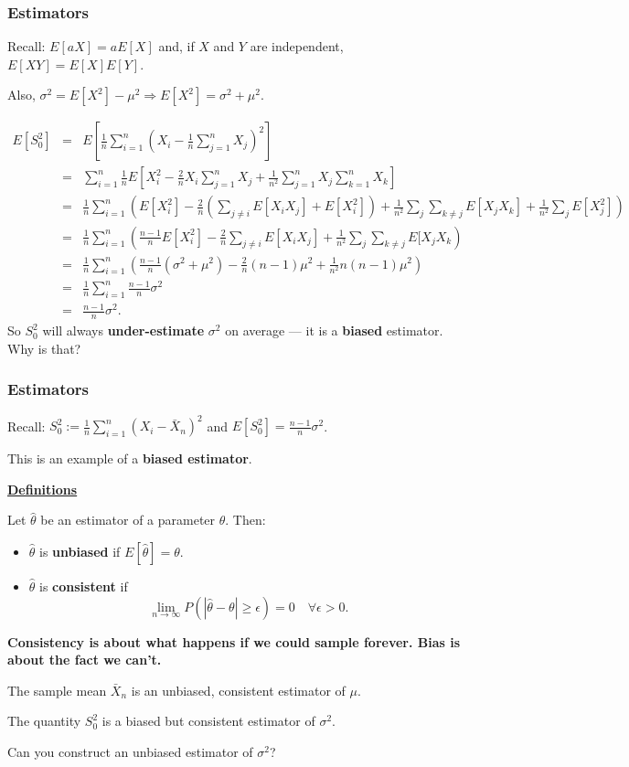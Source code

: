 \documentclass[t,8pt]{beamer}
\begin{document}
\begin{frame}
	\frametitle{Estimators}
	Recall: $E[aX]=aE[X]$ and, if $X$ and $Y$ are independent, $E[XY]=E[X]E[Y]$. \par
	Also, $\sigma^2=E[X^2]-\mu^2\Rightarrow E[X^2]=\sigma^2+\mu^2$. \par
	{\tiny
		\begin{eqnarray*}
			E[S_0^2]
			&=&E\left[\frac{1}{n}\sum_{i=1}^n\left(X_i-\frac{1}{n}\sum_{j=1}^nX_j\right)^2\right] \\
			&=&\sum_{i=1}^n\frac{1}{n}E\left[X_i^2-\frac{2}{n}X_i\sum_{j=1}^nX_j+\frac{1}{n^2}\sum_{j=1}^nX_j\sum_{k=1}^nX_k\right] \\
			&=&\frac{1}{n}\sum_{i=1}^n\left(E[X_i^2]-\frac{2}{n}\left(\sum_{j\neq i}E[X_iX_j]+E[X_i^2]\right)+\frac{1}{n^2}\sum_j\sum_{k\neq j}E[X_jX_k]+\frac{1}{n^2}\sum_jE[X_j^2]\right) \\
			&=&\frac{1}{n}\sum_{i=1}^n\left(\frac{n-1}{n}E[X_i^2]-\frac{2}{n}\sum_{j\neq i}E[X_iX_j]+\frac{1}{n^2}\sum_j\sum_{k\neq j}E[X_jX_k\right) \\
			&=&\frac{1}{n}\sum_{i=1}^n\left(\frac{n-1}{n}(\sigma^2+\mu^2)-\frac{2}{n}(n-1)\mu^2+\frac{1}{n^2}n(n-1)\mu^2\right) \\
			&=&\frac{1}{n}\sum_{i=1}^n\frac{n-1}{n}\sigma^2 \\
			&=&\frac{n-1}{n}\sigma^2.
		\end{eqnarray*}
	}
	So $S_0^2$ will always {\bf under-estimate} $\sigma^2$ on average — it is a {\bf biased} estimator. Why is that?
\end{frame}

\begin{frame}
	\frametitle{Estimators}
	Recall: $S_0^2:=\frac{1}{n}\sum_{i=1}^n(X_i-\bar X_n)^2$ and $E[S_0^2]=\frac{n-1}{n}\sigma^2$. \par
	This is an example of a {\bf biased estimator}. \par
	{\bf\underline{Definitions}} \par
	Let $\hat\theta$ be an estimator of a parameter $\theta$. Then:
	\begin{itemize}
		\item $\hat\theta$ is {\bf unbiased} if $E[\hat\theta]=\theta$.
		\item $\hat\theta$ is {\bf consistent} if
		\[
		\lim_{n\rightarrow\infty}P(|\hat\theta-\theta|\geq\epsilon)=0
		\quad\forall\epsilon>0.
		\]
	\end{itemize}
	{\bf Consistency is about what happens if we could sample forever. Bias is about the fact we can’t.} \par
	The sample mean $\bar X_n$ is an unbiased, consistent estimator of $\mu$. \par
	The quantity $S_0^2$ is a biased but consistent estimator of $\sigma^2$. \par
	Can you construct an unbiased estimator of $\sigma^2$?
\end{frame}
\end{document}
